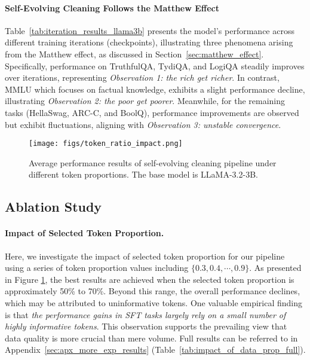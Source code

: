 \paragraph{Self-Evolving Cleaning Follows the Matthew Effect} 
Table~\ref{tab:iteration_results_llama3b} presents the model's performance across different training iterations (checkpoints), illustrating three phenomena arising from the Matthew effect, as discussed in Section~\ref{sec:matthew_effect}.
Specifically, performance on TruthfulQA, TydiQA, and LogiQA steadily improves over iterations, representing \textit{Observation 1: the rich get richer}. In contrast, MMLU which focuses on factual knowledge, exhibits a slight performance decline, illustrating \textit{Observation 2: the poor get poorer}. Meanwhile, for the remaining tasks (HellaSwag, ARC-C, and BoolQ), performance improvements are observed but exhibit fluctuations, aligning with \textit{Observation 3: unstable convergence}.












\begin{figure}[!t]
    \centering
    \texttt{[image: figs/token\_ratio\_impact.png]}
    \caption{Average performance results of self-evolving cleaning pipeline under different token proportions. The base model is LLaMA-3.2-3B.}
    \label{fig:impact_of_token_ratio}
\end{figure}


\subsection{Ablation Study}






\paragraph{Impact of Selected Token Proportion.}

Here, we investigate the impact of selected token proportion for our pipeline using a series of token proportion values including $\{0.3, 0.4, \cdots, 0.9\}$. As presented in Figure \ref{fig:impact_of_token_ratio},  the best results are achieved when the selected token proportion is approximately 50\% to 70\%.  Beyond this range, the overall performance declines, which may be attributed to uninformative tokens. One valuable empirical finding is that \textit{the performance gains in SFT tasks largely rely on a small number of highly informative tokens}. This observation supports the prevailing view that data quality is more crucial than mere volume.
Full results can be referred to in Appendix~\ref{sec:apx_more_exp_results} (Table~\ref{tab:impact_of_data_prop_full}).







